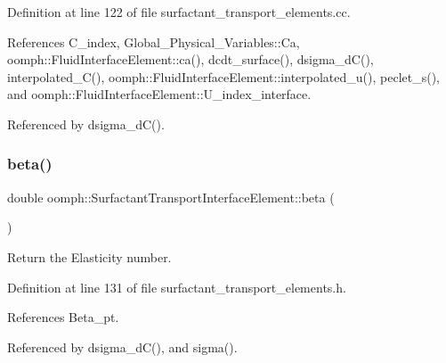 Definition at line 122 of file surfactant\+\_\+transport\+\_\+elements.\+cc.



References C\+\_\+index, Global\+\_\+\+Physical\+\_\+\+Variables\+::\+Ca, oomph\+::\+Fluid\+Interface\+Element\+::ca(), dcdt\+\_\+surface(), dsigma\+\_\+d\+C(), interpolated\+\_\+\+C(), oomph\+::\+Fluid\+Interface\+Element\+::interpolated\+\_\+u(), peclet\+\_\+s(), and oomph\+::\+Fluid\+Interface\+Element\+::\+U\+\_\+index\+\_\+interface.



Referenced by dsigma\+\_\+d\+C().

\mbox{\label{classoomph_1_1SurfactantTransportInterfaceElement_a79003d87401ad6106b8d10373ff12e73}} 
\subsubsection{\texorpdfstring{beta()}{beta()}}
{\footnotesize\ttfamily double oomph\+::\+Surfactant\+Transport\+Interface\+Element\+::beta (\begin{DoxyParamCaption}{ }\end{DoxyParamCaption})\hspace{0.3cm}{\ttfamily [inline]}}



Return the Elasticity number. 



Definition at line 131 of file surfactant\+\_\+transport\+\_\+elements.\+h.



References Beta\+\_\+pt.



Referenced by dsigma\+\_\+d\+C(), and sigma().

\mbox{\label{classoomph_1_1SurfactantTransportInterfaceElement_a7f64f64c3b5ad3abe6e09bb10a039298}} 
